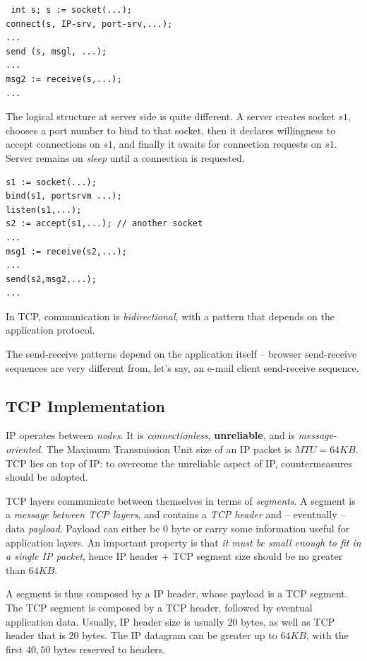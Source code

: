 \documentclass[a4paper, 11pt]{report}
\begin{document}
\begin{verbatim} int s; s := socket(...); 
connect(s, IP-srv, port-srv,...); 
...
send (s, msgl, ...); 
... 
msg2 := receive(s,...); 
... 
\end{verbatim}

The logical structure at server side is quite different. A server creates
socket $s1$, chooses a port number to bind to that socket, then it declares
willingness to accept connections on $s1$, and finally it awaits for connection
requests on $s1$. Server remains on \emph{sleep} until a connection is
requested.

\begin{verbatim} 
s1 := socket(...);
bind(s1, portsrvm ...);
listen(s1,...);
s2 := accept(s1,...); // another socket 
... 
msg1 := receive(s2,...);
...
send(s2,msg2,...);
... 
\end{verbatim}

In TCP, communication is \emph{bidirectional}, with a pattern that depends on
the application protocol.

The send-receive patterns depend on the application itself \--- browser
send-receive sequences are very different from, let's say, an e-mail client
send-receive sequence.

\subsection{TCP Implementation}

IP operates between \emph{nodes}. It is \emph{connectionless},
\textbf{unreliable}, and is \emph{message-oriented}. The Maximum Transmission
Unit size of an IP packet is $MTU = 64KB$. TCP lies on top of IP: to overcome
the unreliable aspect of IP, countermeasures should be adopted.

TCP layers communicate between themselves in terms of \emph{segments}. A
segment is a \emph{message between TCP layers}, and contains a \emph{TCP
header} and \--- eventually \--- data \emph{payload}. Payload can either be $0$
byte or carry some information useful for application layers. An important
property is that \emph{it must be small enough to fit in a single IP packet},
hence IP header + TCP segment size should be no greater than $64KB$.

A segment is thus composed by a IP header, whose payload is a TCP segment. The
TCP segment is composed by a TCP header, followed by eventual application data.
Usually, IP header size is usually $20$ bytes, as well as TCP header that is
$20$ bytes. The IP datagram can be greater up to $64KB$, with the first $40,50$
bytes reserved to headers.
\end{document}
